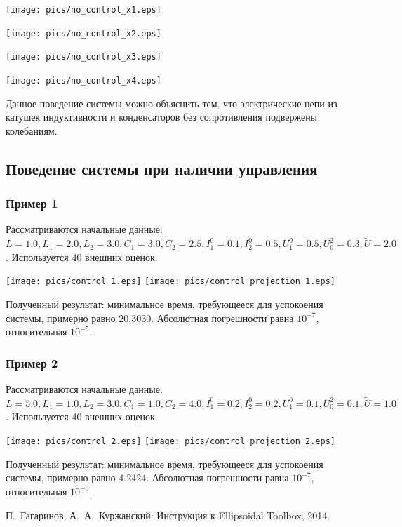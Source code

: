 \documentclass[11pt]{article}
\begin{document}
\texttt{[image: pics/no\_control\_x1.eps]}

\texttt{[image: pics/no\_control\_x2.eps]}

\texttt{[image: pics/no\_control\_x3.eps]}

\texttt{[image: pics/no\_control\_x4.eps]}

Данное поведение системы можно объяснить тем, что электрические цепи из катушек индуктивности и конденсаторов без сопротивления подвержены колебаниям.
\subsection{Поведение системы при наличии управления}
\subsubsection{Пример 1}
Рассматриваются начальные данные: $L = 1.0, L_1 = 2.0, L_2 = 3.0, C_1 = 3.0, C_2 = 2.5, I_1^0 = 0.1, I_2^0 = 0.5, U_1^0 = 0.5, U^2_0 = 0.3, \tilde{U} = 2.0$. Используется 40 внешних оценок.

\texttt{[image: pics/control\_1.eps]}
\texttt{[image: pics/control\_projection\_1.eps]}

Полученный результат: минимальное время, требующееся для успокоения системы, примерно равно $20.3030$. Абсолютная погрешности равна $10^{-7}$, относительная $10^{-5}$.
\subsubsection{Пример 2}
Рассматриваются начальные данные: $L = 5.0, L_1 = 1.0, L_2 = 3.0, C_1 = 1.0, C_2 = 4.0, I_1^0 = 0.2, I_2^0 = 0.2, U_1^0 = 0.1, U^2_0 = 0.1, \tilde{U} = 1.0$. Используется 40 внешних оценок.

\texttt{[image: pics/control\_2.eps]}
\texttt{[image: pics/control\_projection\_2.eps]}

Полученный результат: минимальное время, требующееся для успокоения системы, примерно равно $4.2424$. Абсолютная погрешности равна $10^{-7}$, относительная $10^{-5}$.
\pagebreak
{}
\begin{thebibliography}{99}
	 П.~Гагаринов, А.~А.~Куржанский: Инструкция к Ellipsoidal Toolbox, 2014.
\end{thebibliography}
\end{document}
